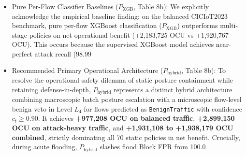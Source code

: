 \documentclass[journal,10pt,onecolumn]{IEEEtran}
\begin{document}
\begin{itemize}
  \item Pure Per-Flow Classifier Baselines ($P_{\text{XGB}}$, Table 8b): We explicitly acknowledge the empirical baseline finding: on the balanced CICIoT2023 benchmark, pure per-flow XGBoost classification ($P_{\text{XGB}}$) outperforms multi-stage policies on net operational benefit (+2,183,725 OCU vs +1,920,767 OCU). This occurs because the supervised XGBoost model achieves near-perfect attack recall (98.99%
  \item Recommended Primary Operational Architecture ($P_{\text{hybrid}}$, Table 8b): To resolve the operational safety dilemma of static posture containment while retaining defense-in-depth, $P_{\text{hybrid}}$ represents a distinct hybrid architecture combining macroscopic batch posture escalation with a microscopic flow-level benign veto in Level $L_4$ for flows predicted as \texttt{BenignTraffic} with confidence $c_t \ge 0.90$. It achieves \textbf{+977,208 OCU on balanced traffic}, \textbf{+2,899,150 OCU on attack-heavy traffic}, and \textbf{+1,931,108 to +1,938,179 OCU combined}, strictly dominating all 70 static policies in net benefit. Crucially, during acute flooding, $P_{\text{hybrid}}$ slashes flood Block FPR from 100.0%
\end{itemize}
\end{document}
